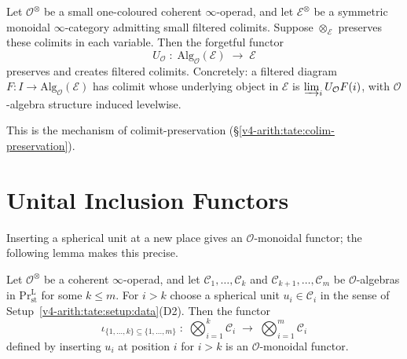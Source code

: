 \begin{proposition}[HA~3.2.3.1]
\label{v4-arith:tate:prop:filtered-colim-operadic}
\ClaimStatusProvedElsewhere Let \(\mathcal{O}^{\otimes}\) be a small
one-coloured coherent \(\infty\)-operad, and let
\(\mathcal{E}^{\otimes}\) be a symmetric monoidal \(\infty\)-category
admitting small filtered colimits. Suppose
\(\otimes_{\mathcal{E}}\) preserves these colimits in each variable.
Then the forgetful functor
\[
U_{\mathcal{O}}\;:\;\mathrm{Alg}_{\mathcal{O}}(\mathcal{E})\;\longrightarrow\;\mathcal{E}
\]
preserves and creates filtered colimits. Concretely: a filtered
diagram \(F:I\to\mathrm{Alg}_{\mathcal{O}}(\mathcal{E})\) has colimit
whose underlying object in \(\mathcal{E}\) is \(\varinjlim_{i}U_{\mathcal{O}}F(i)\),
with \(\mathcal{O}\)-algebra structure induced levelwise.
\end{proposition}

This is the mechanism of colimit-preservation
(\S\ref{v4-arith:tate:colim-preservation}).

\section{Unital Inclusion Functors}
\label{v4-arith:tate:unital-inclusion}

Inserting a spherical unit at a new place gives an
\(\mathcal{O}\)-monoidal functor; the following lemma makes this precise.

\begin{lemma}
\label{v4-arith:tate:lem:unital-incl-is-monoidal}
\ClaimStatusProvedHere Let \(\mathcal{O}^{\otimes}\) be a coherent
\(\infty\)-operad, and let \(\mathcal{C}_{1},\ldots,\mathcal{C}_{k}\)
and \(\mathcal{C}_{k+1},\ldots,\mathcal{C}_{m}\) be
\(\mathcal{O}\)-algebras in \(\mathrm{Pr}^{\mathrm{L}}_{\mathrm{st}}\)
for some \(k\leq m\). For \(i>k\) choose a spherical unit
\(u_{i}\in\mathcal{C}_{i}\) in the sense of
Setup~\ref{v4-arith:tate:setup:data}(D2). Then the functor
\begin{equation}
\label{v4-arith:tate:eq:unital-incl}
\iota_{\{1,\ldots,k\}\subseteq\{1,\ldots,m\}}\;:\;
\bigotimes_{i=1}^{k}\mathcal{C}_{i}\;\longrightarrow\;\bigotimes_{i=1}^{m}\mathcal{C}_{i}
\end{equation}
defined by inserting \(u_{i}\) at position \(i\) for \(i>k\) is an
\(\mathcal{O}\)-monoidal functor.
\end{lemma}

